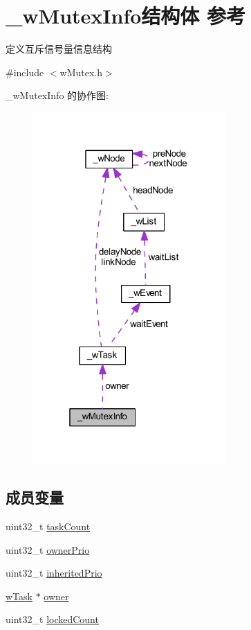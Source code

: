 \hypertarget{struct__w_mutex_info}{}\section{\+\_\+w\+Mutex\+Info结构体 参考}
\label{struct__w_mutex_info}


定义互斥信号量信息结构  




{\ttfamily \#include $<$w\+Mutex.\+h$>$}



\+\_\+w\+Mutex\+Info 的协作图\+:
\nopagebreak
\begin{figure}[H]
\begin{center}
\leavevmode
\includegraphics[width=208pt]{struct__w_mutex_info__coll__graph}
\end{center}
\end{figure}
\subsection*{成员变量}
\begin{DoxyCompactItemize}
\item 
uint32\+\_\+t \mbox{\hyperlink{struct__w_mutex_info_a80462c64b9184115aa568f08227f7f4a}{task\+Count}}
\item 
uint32\+\_\+t \mbox{\hyperlink{struct__w_mutex_info_a2ad329dc18ddf3afd170e73535c5907a}{owner\+Prio}}
\item 
uint32\+\_\+t \mbox{\hyperlink{struct__w_mutex_info_ad2ca878c1d7b4012ae3954a79aa664ef}{inherited\+Prio}}
\item 
\mbox{\hyperlink{w_task_8h_acd0e6238476f631a6ac4588629bac372}{w\+Task}} $\ast$ \mbox{\hyperlink{struct__w_mutex_info_a1ed47712ef6760f64988107466c22321}{owner}}
\item 
uint32\+\_\+t \mbox{\hyperlink{struct__w_mutex_info_a16598f387191bb413e5c802b23e501ef}{locked\+Count}}
\end{DoxyCompactItemize}



